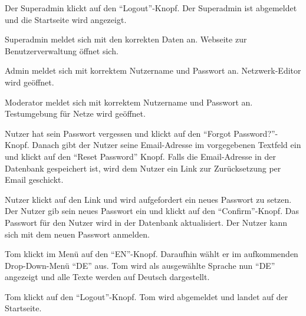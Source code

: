 \documentclass[parskip=full,11pt,twoside]{scrartcl}
\begin{document}
{Der Superadmin klickt auf den \enquote{Logout}-Knopf.}
{Der Superadmin ist abgemeldet und die Startseite wird angezeigt.}


{Superadmin meldet sich mit den korrekten Daten an.}
{Webseite zur Benutzerverwaltung öffnet sich.}

{Admin meldet sich mit korrektem Nutzername und Passwort an.}
{Netzwerk-Editor wird geöffnet.}

{Moderator meldet sich mit korrektem Nutzername und Passwort an.}
{Testumgebung für Netze wird geöffnet.}

{Nutzer hat sein Passwort vergessen und klickt auf den \enquote{Forgot Password?}-Knopf. Danach gibt der Nutzer seine Email-Adresse im vorgegebenen Textfeld ein und klickt auf den \enquote{Reset Password} Knopf.}
{Falls die Email-Adresse in der Datenbank gespeichert ist, wird dem Nutzer ein Link zur Zurücksetzung per Email geschickt.}

{Nutzer klickt auf den Link und wird aufgefordert ein neues Passwort zu setzen. Der Nutzer gib sein neues Passwort ein und klickt auf den \enquote{Confirm}-Knopf.}
{Das Passwort für den Nutzer wird in der Datenbank aktualisiert. Der Nutzer kann sich mit dem neuen Passwort anmelden.}


{Tom klickt im Menü auf den \enquote{EN}-Knopf. Daraufhin wählt er im aufkommenden Drop-Down-Menü \enquote{DE} aus.}
{Tom wird als ausgewählte Sprache nun \enquote{DE} angezeigt und alle Texte werden auf Deutsch dargestellt.}

{Tom klickt auf den \enquote{Logout}-Knopf.}
{Tom wird abgemeldet und landet auf der Startseite.}

\end{document}
